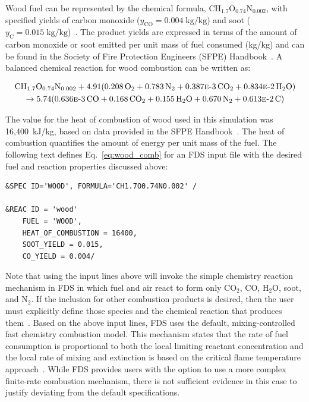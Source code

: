 \documentclass[12pt,oneside]{book}
\renewcommand{\C}{\mbox{C}}
\renewcommand{\H}{\mbox{H}}
\renewcommand{\O}{\mbox{O}}
\newcommand{\N}{\mbox{N}}
\begin{document}
Wood fuel can be represented by the chemical formula, $\C\H_{1.7}\O_{0.74}\N_{0.002}$, with specified yields of carbon monoxide ($y_{\mathrm{CO}}=0.004 \; \mathrm{kg}/\mathrm{kg}$) and soot ($y_{\mathrm{C}}=0.015 \; \mathrm{kg}/\mathrm{kg}$)~\cite{SFPE:Tewarson}. The product yields are expressed in terms of the amount of carbon monoxide or soot emitted per unit mass of fuel consumed (kg/kg) and can be found in the Society of Fire Protection Engineers (SFPE) Handbook~\cite{SFPE:Tewarson}. A balanced chemical reaction for wood combustion can be written as:

\begin{multline}
\C\H_{1.7}\O_{0.74}\N_{0.002} + 4.91(0.208\,\O_{2} + 0.783\,\N_{2} + 0.387\text{\sc{e}-}3\,\C\O_{2} + 0.834\text{\sc{e}-}2\,\H_{2}\O) \\ 
\rightarrow 5.74(0.636\text{\sc{e}-}3\,\C\O + 0.168\,\C\O_{2} + 0.155\,\H_{2}\O + 0.670\,\N_{2} + 0.613\text{\sc{e}-}2\,\C)
\label{eq:wood_comb}
\end{multline}

The value for the heat of combustion of wood used in this simulation was 16,400~kJ/kg, based on data provided in the SFPE Handbook~\cite{SFPE:Tewarson}. The heat of combustion quantifies the amount of energy per unit mass of the fuel. The following text defines Eq.~\ref{eq:wood_comb} for an FDS input file with the desired fuel and reaction properties discussed above:

\begin{lstlisting}
&SPEC ID='WOOD', FORMULA='CH1.7O0.74N0.002' /

&REAC ID = 'wood' 
    FUEL = 'WOOD', 
    HEAT_OF_COMBUSTION = 16400,
    SOOT_YIELD = 0.015,
    CO_YIELD = 0.004/
\end{lstlisting}

Note that using the input lines above will invoke the simple chemistry reaction mechanism in FDS in which fuel and air react to form only CO$_2$, CO, H$_2$O, soot, and N$_2$. If the inclusion for other combustion products is desired, then the user must explicitly define those species and the chemical reaction that produces them~\cite{FDS_Users_Guide}. Based on the above input lines, FDS uses the default, mixing-controlled fast chemistry combustion model. This mechanism states that the rate of fuel consumption is proportional to both the local limiting reactant concentration and the local rate of mixing and extinction is based on the critical flame temperature approach~\cite{FDS_Math_Guide}. While FDS provides users with the option to use a more complex finite-rate combustion mechanism, there is not sufficient evidence in this case to justify deviating from the default specifications. 
\end{document}
